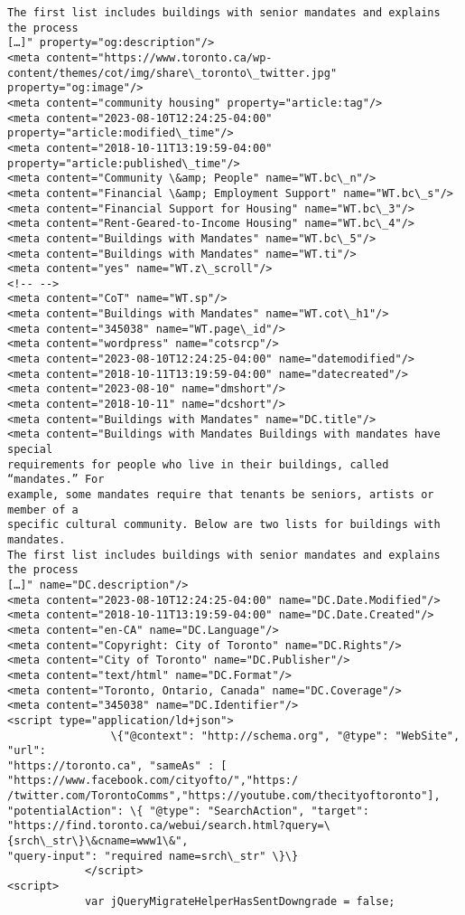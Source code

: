 \documentclass[11pt]{article}
\begin{document}
\begin{Verbatim}[commandchars=\\\{\}]
The first list includes buildings with senior mandates and explains the process
[…]" property="og:description"/>
<meta content="https://www.toronto.ca/wp-
content/themes/cot/img/share\_toronto\_twitter.jpg" property="og:image"/>
<meta content="community housing" property="article:tag"/>
<meta content="2023-08-10T12:24:25-04:00" property="article:modified\_time"/>
<meta content="2018-10-11T13:19:59-04:00" property="article:published\_time"/>
<meta content="Community \&amp; People" name="WT.bc\_n"/>
<meta content="Financial \&amp; Employment Support" name="WT.bc\_s"/>
<meta content="Financial Support for Housing" name="WT.bc\_3"/>
<meta content="Rent-Geared-to-Income Housing" name="WT.bc\_4"/>
<meta content="Buildings with Mandates" name="WT.bc\_5"/>
<meta content="Buildings with Mandates" name="WT.ti"/>
<meta content="yes" name="WT.z\_scroll"/>
<!-- -->
<meta content="CoT" name="WT.sp"/>
<meta content="Buildings with Mandates" name="WT.cot\_h1"/>
<meta content="345038" name="WT.page\_id"/>
<meta content="wordpress" name="cotsrcp"/>
<meta content="2023-08-10T12:24:25-04:00" name="datemodified"/>
<meta content="2018-10-11T13:19:59-04:00" name="datecreated"/>
<meta content="2023-08-10" name="dmshort"/>
<meta content="2018-10-11" name="dcshort"/>
<meta content="Buildings with Mandates" name="DC.title"/>
<meta content="Buildings with Mandates Buildings with mandates have special
requirements for people who live in their buildings, called “mandates.” For
example, some mandates require that tenants be seniors, artists or member of a
specific cultural community. Below are two lists for buildings with mandates.
The first list includes buildings with senior mandates and explains the process
[…]" name="DC.description"/>
<meta content="2023-08-10T12:24:25-04:00" name="DC.Date.Modified"/>
<meta content="2018-10-11T13:19:59-04:00" name="DC.Date.Created"/>
<meta content="en-CA" name="DC.Language"/>
<meta content="Copyright: City of Toronto" name="DC.Rights"/>
<meta content="City of Toronto" name="DC.Publisher"/>
<meta content="text/html" name="DC.Format"/>
<meta content="Toronto, Ontario, Canada" name="DC.Coverage"/>
<meta content="345038" name="DC.Identifier"/>
<script type="application/ld+json">
                \{"@context": "http://schema.org", "@type": "WebSite", "url":
"https://toronto.ca", "sameAs" : [ "https://www.facebook.com/cityofto/","https:/
/twitter.com/TorontoComms","https://youtube.com/thecityoftoronto"],
"potentialAction": \{ "@type": "SearchAction", "target":
"https://find.toronto.ca/webui/search.html?query=\{srch\_str\}\&cname=www1\&",
"query-input": "required name=srch\_str" \}\}
            </script>
<script>
            var jQueryMigrateHelperHasSentDowngrade = false;


\end{Verbatim}
\end{document}
